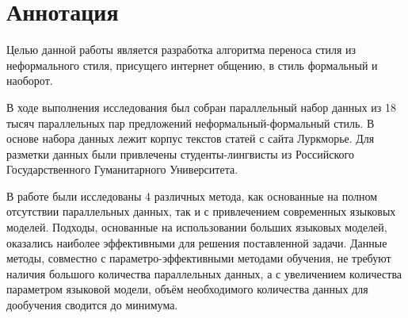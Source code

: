 \chapter*{Аннотация}


Целью данной работы является разработка алгоритма переноса стиля из неформального стиля, присущего интернет общению, в стиль формальный и наоборот.

В ходе выполнения исследования был собран параллельный набор данных из 18 тысяч параллельных пар предложений неформальный-формальный стиль.
В основе набора данных лежит корпус текстов статей с сайта Луркморье.
Для разметки данных были привлечены студенты-лингвисты из Российского Государственного Гуманитарного Университета.

В работе были исследованы 4 различных метода, как основанные на полном отсутствии параллельных данных, так и с привлечением современных языковых моделей.
Подходы, основанные на использовании больших языковых моделей, оказались наиболее эффективными для решения поставленной задачи.
Данные методы, совместно с параметро-эффективными методами обучения, не требуют наличия большого количества параллельных данных, а с увеличением количества параметром языковой модели, объём необходимого количества данных для дообучения сводится до минимума.
